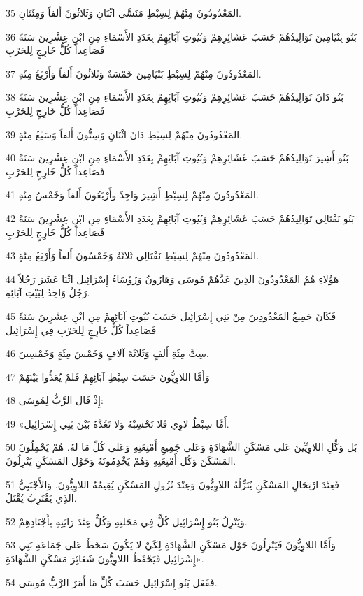 \par 35 المَعْدُودُونَ مِنْهُمْ لِسِبْطِ مَنَسَّى اثْنَانِ وَثَلاثُونَ أَلفاً وَمِئَتَانِ.
\par 36 بَنُو بِنْيَامِينَ تَوَالِيدُهُمْ حَسَبَ عَشَائِرِهِمْ وَبُيُوتِ آبَائِهِمْ بِعَدَدِ الأَسْمَاءِ مِنِ ابْنِ عِشْرِينَ سَنَةً فَصَاعِداً كُلُّ خَارِجٍ لِلحَرْبِ
\par 37 المَعْدُودُونَ مِنْهُمْ لِسِبْطِ بَنْيَامِينَ خَمْسَةٌ وَثَلاثُونَ أَلفاً وَأَرْبَعُ مِئَةٍ.
\par 38 بَنُو دَانَ تَوَالِيدُهُمْ حَسَبَ عَشَائِرِهِمْ وَبُيُوتِ آبَائِهِمْ بِعَدَدِ الأَسْمَاءِ مِنِ ابْنِ عِشْرِينَ سَنَةً فَصَاعِداً كُلُّ خَارِجٍ لِلحَرْبِ
\par 39 المَعْدُودُونَ مِنْهُمْ لِسِبْطِ دَانَ اثْنَانِ وَسِتُّونَ أَلفاً وَسَبْعُ مِئَةٍ.
\par 40 بَنُو أَشِيرَ تَوَالِيدُهُمْ حَسَبَ عَشَائِرِهِمْ وَبُيُوتِ آبَائِهِمْ بِعَدَدِ الأَسْمَاءِ مِنِ ابْنِ عِشْرِينَ سَنَةً فَصَاعِداً كُلُّ خَارِجٍ لِلحَرْبِ
\par 41 المَعْدُودُونَ مِنْهُمْ لِسِبْطِ أَشِيرَ وَاحِدٌ وأَرْبَعُونَ أَلفاً وَخَمْسُ مِئَةٍ.
\par 42 بَنُو نَفْتَالِي تَوَالِيدُهُمْ حَسَبَ عَشَائِرِهِمْ وَبُيُوتِ آبَائِهِمْ بِعَدَدِ الأَسْمَاءِ مِنِ ابْنِ عِشْرِينَ سَنَةً فَصَاعِداً كُلُّ خَارِجٍ لِلحَرْبِ
\par 43 المَعْدُودُونَ مِنْهُمْ لِسِبْطِ نَفْتَالِي ثَلاثَةٌ وَخَمْسُونَ أَلفاً وَأَرْبَعُ مِئَةٍ.
\par 44 هَؤُلاءِ هُمُ المَعْدُودُونَ الذِينَ عَدَّهُمْ مُوسَى وَهَارُونُ وَرُؤَسَاءُ إِسْرَائِيل اثْنَا عَشَرَ رَجُلاً رَجُلٌ وَاحِدٌ لِبَيْتِ آبَائِهِ.
\par 45 فَكَانَ جَمِيعُ المَعْدُودِينَ مِنْ بَنِي إِسْرَائِيل حَسَبَ بُيُوتِ آبَائِهِمْ مِنِ ابْنِ عِشْرِينَ سَنَةً فَصَاعِداً كُلُّ خَارِجٍ لِلحَرْبِ فِي إِسْرَائِيل
\par 46 سِتَّ مِئَةِ أَلفٍ وَثَلاثَةَ آلافٍ وَخَمْسَ مِئَةٍ وَخَمْسِينَ.
\par 47 وَأَمَّا اللاوِيُّونَ حَسَبَ سِبْطِ آبَائِهِمْ فَلمْ يُعَدُّوا بَيْنَهُمْ
\par 48 إِذْ قَال الرَّبُّ لِمُوسَى:
\par 49 «أَمَّا سِبْطُ لاوِي فَلا تَحْسِبْهُ وَلا تَعُدَّهُ بَيْنَ بَنِي إِسْرَائِيل.
\par 50 بَل وَكِّلِ اللاوِيِّينَ عَلى مَسْكَنِ الشَّهَادَةِ وَعَلى جَمِيعِ أَمْتِعَتِهِ وَعَلى كُلِّ مَا لهُ. هُمْ يَحْمِلُونَ المَسْكَنَ وَكُل أَمْتِعَتِهِ وَهُمْ يَخْدِمُونَهُ وَحَوْل المَسْكَنِ يَنْزِلُونَ.
\par 51 فَعِنْدَ ارْتِحَالِ المَسْكَنِ يُنَزِّلُهُ اللاوِيُّونَ وَعِنْدَ نُزُولِ المَسْكَنِ يُقِيمُهُ اللاوِيُّونَ. وَالأَجْنَبِيُّ الذِي يَقْتَرِبُ يُقْتَلُ.
\par 52 وَيَنْزِلُ بَنُو إِسْرَائِيل كُلٌّ فِي مَحَلتِهِ وَكُلٌّ عِنْدَ رَايَتِهِ بِأَجْنَادِهِمْ.
\par 53 وَأَمَّا اللاوِيُّونَ فَيَنْزِلُونَ حَوْل مَسْكَنِ الشَّهَادَةِ لِكَيْ لا يَكُونَ سَخَطٌ عَلى جَمَاعَةِ بَنِي إِسْرَائِيل فَيَحْفَظُ اللاوِيُّونَ شَعَائِرَ مَسْكَنِ الشَّهَادَةِ».
\par 54 فَفَعَل بَنُو إِسْرَائِيل حَسَبَ كُلِّ مَا أَمَرَ الرَّبُّ مُوسَى.

